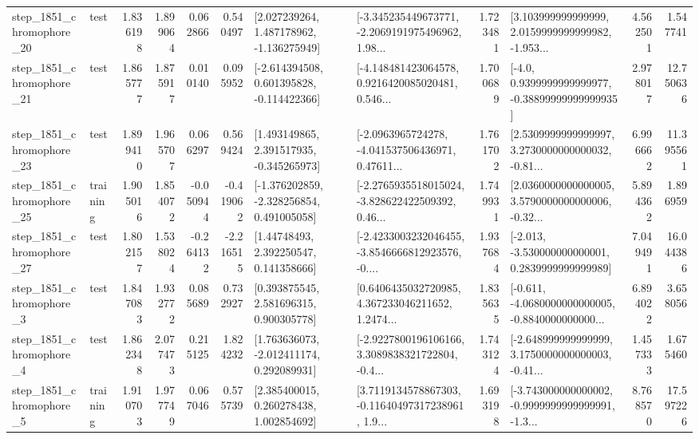 \begin{tabular}{llrrrrllrlrr}
 step\_1851\_chromophore\_20 &      test &      1.836198 &    1.899064 &      0.062866 &  0.540497 &    [2.027239264, 1.487178962, -1.136275949] &  [-3.345235449673771, -2.2069191975496962, 1.98... &       1.723481 &  [3.103999999999999, 2.0159999999999982, -1.953... &            4.562501 &          1.547741 \\
 step\_1851\_chromophore\_21 &      test &      1.865777 &    1.875917 &      0.010140 &  0.095952 &   [-2.614394508, 0.601395828, -0.114422366] &  [-4.148481423064578, 0.9216420085020481, 0.546... &       1.700689 &   [-4.0, 0.9399999999999977, -0.38899999999999935] &            2.978017 &         12.750636 \\
 step\_1851\_chromophore\_23 &      test &      1.899410 &    1.965707 &      0.066297 &  0.569424 &    [1.493149865, 2.391517935, -0.345265973] &  [-2.0963965724278, -4.041537506436971, 0.47611... &       1.761702 &  [2.5309999999999997, 3.2730000000000032, -0.81... &            6.996662 &         11.395561 \\
 step\_1851\_chromophore\_25 &  training &      1.905016 &    1.854072 &     -0.050944 & -0.419062 &   [-1.376202859, -2.328256854, 0.491005058] &  [-2.2765935518015024, -3.828622422509392, 0.46... &       1.749931 &  [2.0360000000000005, 3.5790000000000006, -0.32... &            5.894362 &          1.896959 \\
 step\_1851\_chromophore\_27 &      test &      1.802157 &    1.538024 &     -0.264132 & -2.216515 &      [1.44748493, 2.392250547, 0.141358666] &  [-2.4233003232046455, -3.8546666812923576, -0.... &       1.937684 &   [-2.013, -3.530000000000001, 0.2839999999999989] &            7.049491 &         16.044386 \\
  step\_1851\_chromophore\_3 &      test &      1.847083 &    1.932772 &      0.085689 &  0.732927 &     [0.393875545, 2.581696315, 0.900305778] &  [0.6406435032720985, 4.367233046211652, 1.2474... &       1.835635 &  [-0.611, -4.0680000000000005, -0.8840000000000... &            6.894022 &          3.658056 \\
  step\_1851\_chromophore\_4 &      test &      1.862348 &    2.077473 &      0.215125 &  1.824232 &    [1.763636073, -2.012411174, 0.292089931] &  [-2.9227800196106166, 3.3089838321722804, -0.4... &       1.743124 &  [-2.648999999999999, 3.1750000000000003, -0.41... &            1.457333 &          1.675460 \\
  step\_1851\_chromophore\_5 &  training &      1.910703 &    1.977749 &      0.067046 &  0.575739 &     [2.385400015, 0.260278438, 1.002854692] &  [3.7119134578867303, -0.11640497317238961, 1.9... &       1.693198 &  [-3.743000000000002, -0.9999999999999991, -1.3... &            8.768570 &         17.597226 \\

\end{tabular}
